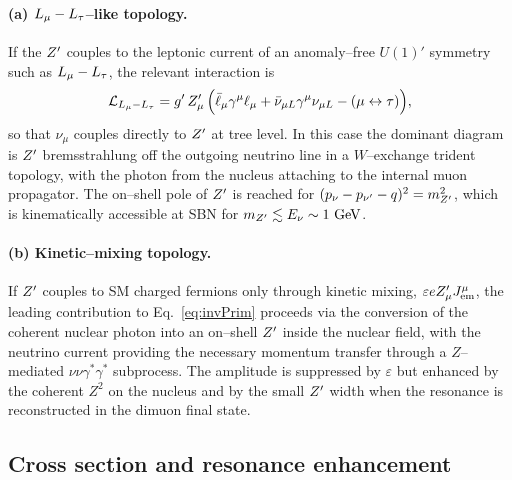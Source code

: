 \paragraph{(a) $L_\mu - L_\tau$--like topology.} If the $Z^{\prime}$ couples to
the leptonic current of an anomaly--free $U(1)'$ symmetry such as
$L_\mu - L_\tau$, the relevant interaction is
\begin{equation}
  \mathcal{L}_{L_\mu - L_\tau} =
  g'\,Z^{\prime}_\mu\,\Big(\bar\ell_\mu \gamma^\mu \ell_\mu
                   + \bar\nu_{\mu L}\gamma^\mu \nu_{\mu L}
                   - (\mu \leftrightarrow \tau)\Big),
\end{equation}
so that $\nu_\mu$ couples directly to $Z^{\prime}$ at tree level.  In this
case the dominant diagram is $Z^{\prime}$ bremsstrahlung off the outgoing
neutrino line in a $W$--exchange trident topology, with the photon
from the nucleus attaching to the internal muon propagator.  The
on--shell pole of $Z^{\prime}$ is reached for
$(p_\nu - p_{\nu'} - q)^2 = m_{Z^{\prime}}^2$, which is kinematically accessible
at SBN for $m_{Z^{\prime}} \lesssim E_\nu \sim 1~\text{GeV}$.

\paragraph{(b) Kinetic--mixing topology.} If $Z^{\prime}$ couples to SM
charged fermions only through kinetic mixing, $\varepsilon e Z^{\prime}_\mu
J^\mu_{\rm em}$, the leading contribution to
Eq.~\eqref{eq:invPrim} proceeds via the conversion of the coherent
nuclear photon into an on--shell $Z^{\prime}$ inside the nuclear field,
with the neutrino current providing the necessary momentum transfer
through a $Z$--mediated $\nu \nu \gamma^* \gamma^*$ subprocess.  The
amplitude is suppressed by $\varepsilon$ but enhanced by the coherent
$Z^2$ on the nucleus and by the small $Z^{\prime}$ width when the resonance
is reconstructed in the dimuon final state.

\subsection{Cross section and resonance enhancement}


